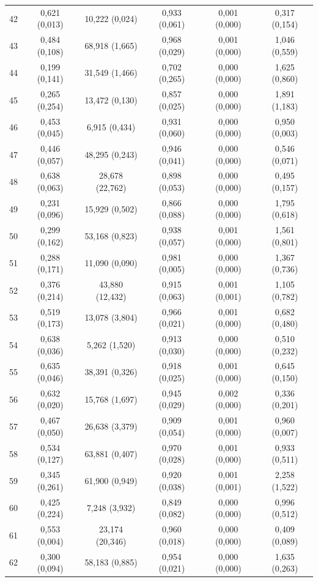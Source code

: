 \begin{tabular}{l c c c c c}
42 & 0,621 (0,013) & 10,222 (0,024) & 0,933 (0,061) & 0,001 (0,000) & 0,317 (0,154) \\
43 & 0,484 (0,108) & 68,918 (1,665) & 0,968 (0,029) & 0,001 (0,000) & 1,046 (0,559) \\
44 & 0,199 (0,141) & 31,549 (1,466) & 0,702 (0,265) & 0,000 (0,000) & 1,625 (0,860) \\
45 & 0,265 (0,254) & 13,472 (0,130) & 0,857 (0,025) & 0,000 (0,000) & 1,891 (1,183) \\
46 & 0,453 (0,045) & 6,915 (0,434) & 0,931 (0,060) & 0,000 (0,000) & 0,950 (0,003) \\
47 & 0,446 (0,057) & 48,295 (0,243) & 0,946 (0,041) & 0,000 (0,000) & 0,546 (0,071) \\
48 & 0,638 (0,063) & 28,678 (22,762) & 0,898 (0,053) & 0,000 (0,000) & 0,495 (0,157) \\
49 & 0,231 (0,096) & 15,929 (0,502) & 0,866 (0,088) & 0,000 (0,000) & 1,795 (0,618) \\
50 & 0,299 (0,162) & 53,168 (0,823) & 0,938 (0,057) & 0,001 (0,000) & 1,561 (0,801) \\
51 & 0,288 (0,171) & 11,090 (0,090) & 0,981 (0,005) & 0,000 (0,000) & 1,367 (0,736) \\
52 & 0,376 (0,214) & 43,880 (12,432) & 0,915 (0,063) & 0,001 (0,001) & 1,105 (0,782) \\
53 & 0,519 (0,173) & 13,078 (3,804) & 0,966 (0,021) & 0,001 (0,000) & 0,682 (0,480) \\
54 & 0,638 (0,036) & 5,262 (1,520) & 0,913 (0,030) & 0,000 (0,000) & 0,510 (0,232) \\
55 & 0,635 (0,046) & 38,391 (0,326) & 0,918 (0,025) & 0,001 (0,000) & 0,645 (0,150) \\
56 & 0,632 (0,020) & 15,768 (1,697) & 0,945 (0,029) & 0,002 (0,000) & 0,336 (0,201) \\
57 & 0,467 (0,050) & 26,638 (3,379) & 0,909 (0,054) & 0,001 (0,000) & 0,960 (0,007) \\
58 & 0,534 (0,127) & 63,881 (0,407) & 0,970 (0,028) & 0,001 (0,000) & 0,933 (0,511) \\
59 & 0,345 (0,261) & 61,900 (0,949) & 0,920 (0,038) & 0,001 (0,001) & 2,258 (1,522) \\
60 & 0,425 (0,224) & 7,248 (3,932) & 0,849 (0,082) & 0,000 (0,000) & 0,996 (0,512) \\
61 & 0,553 (0,004) & 23,174 (20,346) & 0,960 (0,018) & 0,000 (0,000) & 0,409 (0,089) \\
62 & 0,300 (0,094) & 58,183 (0,885) & 0,954 (0,021) & 0,000 (0,000) & 1,635 (0,263) \\

\end{tabular}
